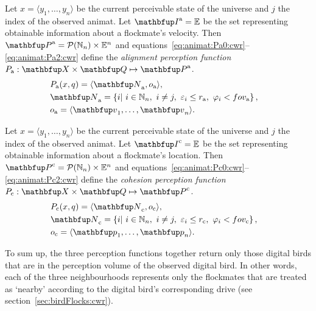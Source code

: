 \begin{definition}
\label{def:animat:Pa:cwr}
Let $x=\langle y_1,\ldots,y_n \rangle$ be the current perceivable state of the universe and $j$ the index of the observed animat. Let $\set{I}^\textnormal{a}=\E$ be the set representing obtainable information about a flockmate's velocity. Then $\set{P}^\textnormal{a}=\powset{\N_n} \times \E^n$ and equations~\eqref{eq:animat:Pa0:cwr}--\eqref{eq:animat:Pa2:cwr} define the \emph{alignment perception function} $P_\textnormal{a}: \set{X} \times \set{Q} \mapsto \set{P}^\textnormal{a}$.
\begin{eqnarray}
& P_\textnormal{a}(x,q)=\langle\set{N}_\textnormal{a},o_\textnormal{a}\rangle, & \label{eq:animat:Pa0:cwr} \\
& \set{N}_\textnormal{a}=\left\{i|\ i \in \N_n,\ i \neq j,\ \varepsilon_i%
 \leq r_\textnormal{a},\ \varphi_i%
 < \fov_\textnormal{a}\right\}, & \\ 
& o_\textnormal{a}=\langle \vect{v}_1,\ldots,\vect{v}_n\rangle. & \label{eq:animat:Pa2:cwr}
\end{eqnarray}
\end{definition}

\begin{definition}
\label{def:animat:Pc:cwr}
Let $x=\langle y_1,\ldots,y_n \rangle$ be the current perceivable state of the universe and $j$ the index of the observed animat. Let $\set{I}^\textnormal{c}=\E$ be the set representing obtainable information about a flockmate's location. Then $\set{P}^\textnormal{c}=\powset{\N_n} \times \E^n$ and equations~\eqref{eq:animat:Pc0:cwr}--\eqref{eq:animat:Pc2:cwr} define the \emph{cohesion perception function} $P_\textnormal{c}: \set{X} \times \set{Q} \mapsto \set{P}^\textnormal{c}$.
\begin{eqnarray}
& P_\textnormal{c}(x,q)=\langle\set{N}_\textnormal{c},o_\textnormal{c}\rangle, & \label{eq:animat:Pc0:cwr} \\
& \set{N}_\textnormal{c}=\left\{i|\ i \in \N_n,\ i \neq j,\ \varepsilon_i%
 \leq r_\textnormal{c},\ \varphi_i%
 < \fov_\textnormal{c}\right\}, & \\
& o_\textnormal{c}=\langle \vect{p}_1,\ldots,\vect{p}_n\rangle. & \label{eq:animat:Pc2:cwr}
\end{eqnarray}
\end{definition}

To sum up, the three perception functions together return only those digital birds that are in the perception volume of the observed digital bird. In other words, each of the three neighbourhoods represents only the flockmates that are treated as `nearby' according to the digital bird's corresponding drive \cite{reynolds:1987} (see section~\ref{sec:birdFlocks:cwr}).

